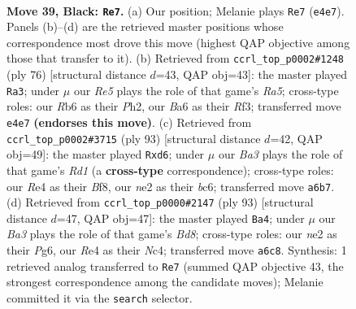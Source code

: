 \documentclass[11pt]{article}
\begin{document}
\clearpage

\begin{figure}[p]\centering
\begin{subfigure}{0.46\textwidth}\centering
\resizebox{\linewidth}{!}{%
\newchessgame
\chessboard[
  setfen={8/p7/br1p3k/2pB4/2P1r3/6P1/4NR1K/R7 b - - 5 39},
  showmover=false,
  pgfstyle=straightmove, color=movearrow, markmove={e4-e7}
]}
\caption{}
\end{subfigure}\hfill
\begin{subfigure}{0.46\textwidth}\centering
\resizebox{\linewidth}{!}{%
\newchessgame
\chessboard[
  setfen={5r1k/7p/1r6/RPp2p2/8/2bPBR1K/7P/8 w - - 7 39},
  showmover=false,
  pgfstyle=straightmove, color=movearrow, markmove={a5-a3}
]}
\caption{}
\end{subfigure}
\\[4pt]
\begin{subfigure}{0.46\textwidth}\centering
\resizebox{\linewidth}{!}{%
\newchessgame
\chessboard[
  setfen={3r1b2/r7/1pBPN2k/4p3/p7/2P2P2/1P4K1/3R4 b - - 2 47},
  showmover=false,
  pgfstyle=straightmove, color=movearrow, markmove={d8-d6}
]}
\caption{}
\end{subfigure}\hfill
\begin{subfigure}{0.46\textwidth}\centering
\resizebox{\linewidth}{!}{%
\newchessgame
\chessboard[
  setfen={8/5pk1/6p1/1p4P1/2nrB1N1/P1R2PK1/8/3b4 b - - 6 47},
  showmover=false,
  pgfstyle=straightmove, color=movearrow, markmove={d1-a4}
]}
\caption{}
\end{subfigure}
\caption{\textbf{Move 39, Black: \texttt{Re7}.} (a) Our position; Melanie plays \texttt{Re7} (\texttt{e4e7}). Panels (b)--(d) are the retrieved master positions whose correspondence most drove this move (highest QAP objective among those that transfer to it). (b) Retrieved from \texttt{ccrl\_top\_p0002\#1248} (ply 76) [structural distance $d$=43, QAP obj=43]: the master played \texttt{Ra3}; under $\mu$ our \emph{Re5} plays the role of that game's \emph{Ra5}; cross-type roles: our \emph{R}b6 as their \emph{P}h2, our \emph{B}a6 as their \emph{R}f3; transferred move \texttt{e4e7} \textbf{(endorses this move)}. (c) Retrieved from \texttt{ccrl\_top\_p0002\#3715} (ply 93) [structural distance $d$=42, QAP obj=49]: the master played \texttt{Rxd6}; under $\mu$ our \emph{Ba3} plays the role of that game's \emph{Rd1} (a \textbf{cross-type} correspondence); cross-type roles: our \emph{R}e4 as their \emph{B}f8, our \emph{n}e2 as their \emph{b}c6; transferred move \texttt{a6b7}. (d) Retrieved from \texttt{ccrl\_top\_p0000\#2147} (ply 93) [structural distance $d$=47, QAP obj=47]: the master played \texttt{Ba4}; under $\mu$ our \emph{Ba3} plays the role of that game's \emph{Bd8}; cross-type roles: our \emph{n}e2 as their \emph{P}g6, our \emph{R}e4 as their \emph{N}c4; transferred move \texttt{a6c8}. Synthesis: 1 retrieved analog transferred to \texttt{Re7} (summed QAP objective 43, the strongest correspondence among the candidate moves); Melanie committed it via the \texttt{search} selector.}
\label{fig:thought-m77}
\end{figure}
\end{document}
